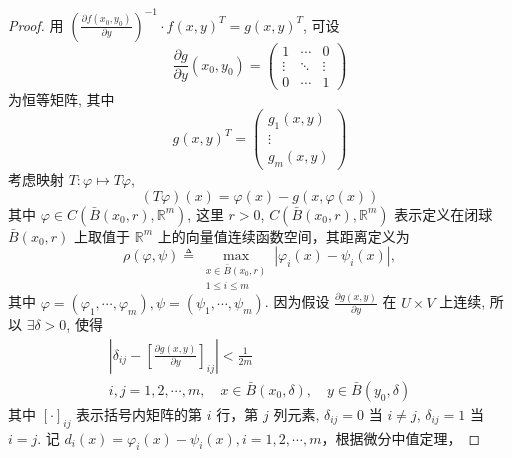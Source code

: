 \documentclass[lang=cn,newtx,10pt,scheme=chinese,thmcnt=chapter]{elegantbook}
\begin{document}
\begin{proof}
用 \( \left(\frac{\partial f(x_0, y_0)}{\partial y}\right)^{-1} \cdot f(x, y)^T   = g(x, y)^T \), 可设
\begin{equation*}
\frac{\partial g}{\partial y}(x_0, y_0) = \left( \begin{array}{ccc}
1 & \cdots & 0 \\
\vdots & \ddots & \vdots \\
0 & \cdots & 1
\end{array} \right)
\end{equation*}
为恒等矩阵, 其中
\begin{equation*}
g(x, y)^T = \left( \begin{array}{c}
g_1(x, y) \\
\vdots \\
g_m(x, y)
\end{array} \right)
\end{equation*}
考虑映射 \( T: \varphi \mapsto T \varphi \),
\begin{equation*}
(T \varphi)(x) = \varphi(x) - g(x, \varphi(x))
\end{equation*}
其中 \( \varphi \in C\left(\bar{B}(x_0, r), \mathbb{R}^m\right) \), 这里 \( r > 0 \), \( C\left(\bar{B}(x_0, r), \mathbb{R}^m\right) \) 表示定义在闭球 \( \bar{B}(x_0, r) \) 上取值于 \( \mathbb{R}^m \) 上的向量值连续函数空间，其距离定义为
\begin{equation*}
\rho(\varphi, \psi) \triangleq \max_{\substack{x \in \bar{B}(x_0, r) \\ 1 \leqslant i \leqslant m}} \left|\varphi_i(x) - \psi_i(x)\right|,
\end{equation*}
其中 \( \varphi = (\varphi_1, \cdots, \varphi_m), \psi = (\psi_1, \cdots, \psi_m) \). 因为假设 \( \frac{\partial g(x, y)}{\partial y} \) 在 \( U \times V \) 上连续, 所以 \( \exists \delta > 0 \), 使得
\begin{equation*}
\begin{gathered}
\left|\delta_{ij} - \left[\frac{\partial g(x, y)}{\partial y}\right]_{ij}\right| < \frac{1}{2m} \\
i, j = 1, 2, \cdots, m, \quad x \in \bar{B}(x_0, \delta), \quad y \in \bar{B}(y_0, \delta)
\end{gathered}
\end{equation*}
其中 \( \left[ \cdot \right]_{ij} \) 表示括号内矩阵的第 \(i\) 行，第 \(j\) 列元素, \( \delta_{ij} = 0 \) 当 \( i \neq j \), \( \delta_{ij} = 1 \) 当 \( i = j \). 记 \( d_i(x) = \varphi_i(x) - \psi_i(x), i = 1, 2, \cdots, m \)，根据微分中值定理，

\end{proof}
\end{document}
